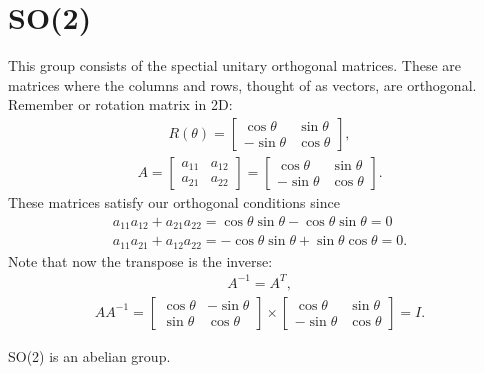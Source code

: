 \documentclass[../../note.tex]{subfiles}
\begin{document}
\section{SO(2)}
This group consists of the spectial unitary orthogonal matrices. These are matrices where the columns and rows, thought of as vectors, are orthogonal. Remember or rotation matrix in 2D:
\begin{align}
    R(\theta) =
    \left[\begin{matrix}
     \cos \theta & \sin \theta \\
     -\sin \theta & \cos \theta   
    \end{matrix}\right],
\end{align}
\begin{align}
    A =
    \left[\begin{matrix}
        a_{11} & a_{12} \\
        a_{21} & a_{22}   
       \end{matrix}\right]
    =
    \left[\begin{matrix}
     \cos \theta & \sin \theta \\
     -\sin \theta & \cos \theta   
    \end{matrix}\right].
\end{align}
These matrices satisfy our orthogonal conditions since
\begin{align}
    a_{11}a_{12} + a_{21}a_{22} = \cos \theta \sin \theta - \cos \theta \sin \theta = 0 \\
    a_{11}a_{21} + a_{12}a_{22} = -\cos \theta \sin \theta + \sin \theta \cos \theta = 0.
\end{align}
Note that now the transpose is the inverse:
\begin{align}
    A^{-1} = A^T,
\end{align}
\begin{align}
    AA^{-1} =
    \left[\begin{matrix}
        \cos \theta & - \sin \theta \\
        \sin \theta & \cos \theta   
       \end{matrix}\right]
    \times
    \left[\begin{matrix}
     \cos \theta & \sin \theta \\
     -\sin \theta & \cos \theta   
    \end{matrix}\right]
    = I.
\end{align}

\begin{lemma}
    SO(2) is an abelian group.
\end{lemma}
\end{document}
